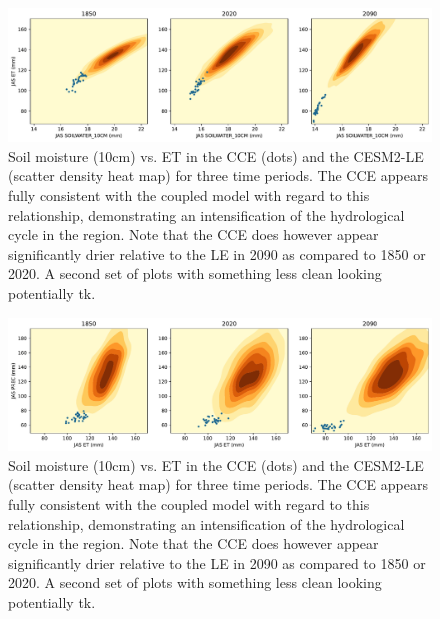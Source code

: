 \documentclass[draft]{agujournal2019}
\begin{document}
\begin{figure}
\includegraphics[width=35pc]{../figs/main/contours_ET_SW.pdf}
\caption{Soil moisture (10cm) vs. ET in the CCE (dots) and the CESM2-LE (scatter density heat map) for three time periods. The CCE appears fully consistent with the coupled model with regard to this relationship, demonstrating an intensification of the hydrological cycle in the region. Note that the CCE does however appear significantly drier relative to the LE in 2090 as compared to 1850 or 2020. A second set of plots with something less clean looking potentially tk.}
\end{figure}


\begin{figure}
\includegraphics[width=35pc]{../figs/main/contours_PREC_ET.pdf}
\caption{Soil moisture (10cm) vs. ET in the CCE (dots) and the CESM2-LE (scatter density heat map) for three time periods. The CCE appears fully consistent with the coupled model with regard to this relationship, demonstrating an intensification of the hydrological cycle in the region. Note that the CCE does however appear significantly drier relative to the LE in 2090 as compared to 1850 or 2020. A second set of plots with something less clean looking potentially tk.}
\end{figure}
\end{document}
